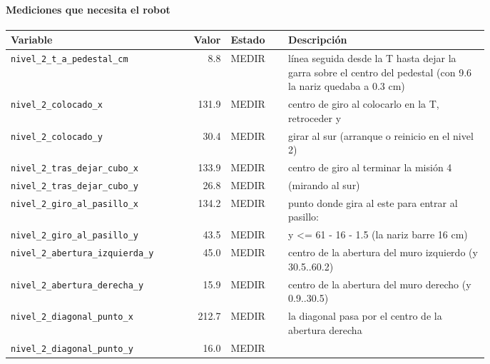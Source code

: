 \paragraph{Mediciones que necesita el robot}
\begin{longtable}{@{}p{0.36\linewidth}rlp{0.42\linewidth}@{}}\toprule
\textbf{Variable} & \textbf{Valor} & \textbf{Estado} & \textbf{Descripci\'on} \\\midrule\endhead
\texttt{nivel\_\allowbreak{}2\_\allowbreak{}t\_\allowbreak{}a\_\allowbreak{}pedestal\_\allowbreak{}cm} & 8.8 & MEDIR & línea seguida desde la T hasta dejar la garra sobre el centro del pedestal (con 9.6 la nariz quedaba a 0.3 cm) \\
\texttt{nivel\_\allowbreak{}2\_\allowbreak{}colocado\_\allowbreak{}x} & 131.9 & MEDIR & centro de giro al colocarlo en la T, retroceder y \\
\texttt{nivel\_\allowbreak{}2\_\allowbreak{}colocado\_\allowbreak{}y} & 30.4 & MEDIR & girar al sur (arranque o reinicio en el nivel 2) \\
\texttt{nivel\_\allowbreak{}2\_\allowbreak{}tras\_\allowbreak{}dejar\_\allowbreak{}cubo\_\allowbreak{}x} & 133.9 & MEDIR & centro de giro al terminar la misión 4 \\
\texttt{nivel\_\allowbreak{}2\_\allowbreak{}tras\_\allowbreak{}dejar\_\allowbreak{}cubo\_\allowbreak{}y} & 26.8 & MEDIR & (mirando al sur) \\
\texttt{nivel\_\allowbreak{}2\_\allowbreak{}giro\_\allowbreak{}al\_\allowbreak{}pasillo\_\allowbreak{}x} & 134.2 & MEDIR & punto donde gira al este para entrar al pasillo: \\
\texttt{nivel\_\allowbreak{}2\_\allowbreak{}giro\_\allowbreak{}al\_\allowbreak{}pasillo\_\allowbreak{}y} & 43.5 & MEDIR & y <= 61 - 16 - 1.5 (la nariz barre 16 cm) \\
\texttt{nivel\_\allowbreak{}2\_\allowbreak{}abertura\_\allowbreak{}izquierda\_\allowbreak{}y} & 45.0 & MEDIR & centro de la abertura del muro izquierdo (y 30.5..60.2) \\
\texttt{nivel\_\allowbreak{}2\_\allowbreak{}abertura\_\allowbreak{}derecha\_\allowbreak{}y} & 15.9 & MEDIR & centro de la abertura del muro derecho (y 0.9..30.5) \\
\texttt{nivel\_\allowbreak{}2\_\allowbreak{}diagonal\_\allowbreak{}punto\_\allowbreak{}x} & 212.7 & MEDIR & la diagonal pasa por el centro de la abertura derecha \\
\texttt{nivel\_\allowbreak{}2\_\allowbreak{}diagonal\_\allowbreak{}punto\_\allowbreak{}y} & 16.0 & MEDIR &  \\

\end{longtable}
